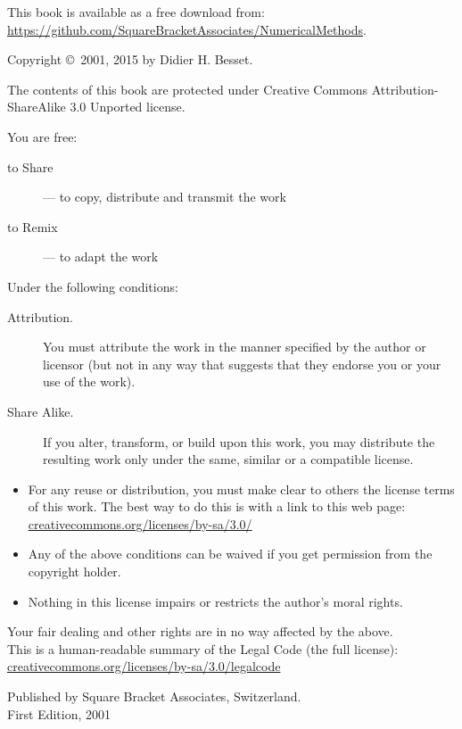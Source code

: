 \begin{footnotesize}
\vspace*{\fill}
\setlength{\parindent}{0pt}
This book is available as a free download from:\\ \url{https://github.com/SquareBracketAssociates/NumericalMethods}.
\bigskip

Copyright \copyright~2001, 2015 by Didier H. Besset.
\bigskip

The contents of this book are protected under Creative Commons Attribution-ShareAlike 3.0 Unported license.
\medskip

You are free:
\begin{description}
  \item[to Share] --- to copy, distribute and transmit the work
  \item[to Remix] --- to adapt the work
\end{description}
\medskip

Under the following conditions:
\begin{description}
  \item[Attribution.] You must attribute the work in the manner specified by the author or licensor (but not in any way that suggests that they endorse you or your use of the work).
  \item[Share Alike.] If you alter, transform, or build upon this work, you may distribute the resulting work only under the same, similar or a compatible license.
\end{description}
\begin{itemize}
  \item For any reuse or distribution, you must make clear to others the license terms of this work. The best way to do this is with a link to this web page:
  \url{creativecommons.org/licenses/by-sa/3.0/}
  \item Any of the above conditions can be waived if you get permission from the copyright holder.
  \item Nothing in this license impairs or restricts the author's moral rights.
\end{itemize}
\quad
\parbox{\textwidth}{
	Your fair dealing and other rights are in no way affected by the above.\\
	This is a human-readable summary of the Legal Code (the full license):\\
	\url{creativecommons.org/licenses/by-sa/3.0/legalcode}}
\bigskip

Published by Square Bracket Associates, Switzerland.\\
First Edition, 2001
\vspace*{\fill}
\end{footnotesize}
